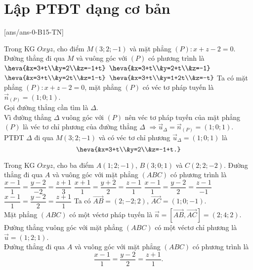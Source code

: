 \section{Lập PTĐT dạng cơ bản}
\TN
{}[ans/ans-0-B15-TN]
\setcounter{ex}{9}
\begin{ex}%
	Trong KG $Oxyz$, cho điểm $M(3;2 ;-1)$ và mặt phẳng $(P)\colon x+z-2=0$. Đường thẳng đi qua $M$ và vuông góc với $(P)$ có phương trình là
	\choice
	{\True $\heva{&x=3+t\\&y=2\\&z=-1+t}$}
	{$\heva{&x=3+t\\&y=2+t\\&z=-1}$}
	{$\heva{&x=3+t\\&y=2t\\&z=1-t}$}
	{$\heva{&x=3+t\\&y=1+2t\\&z=-t}$}
	\loigiai
	{
	Ta có mặt phẳng $(P)\colon x+z-2=0$, mặt phẳng $(P)$ có véc tơ pháp tuyến là $\overrightarrow{n}_{(P)}=(1;0;1)$.\\
		Gọi đường thẳng cần tìm là $\Delta$.\\
		Vì đường thẳng $\Delta$ vuông góc với $(P)$ nên véc tơ pháp tuyến của mặt phẳng $(P)$ là véc tơ chỉ phương của đường thẳng $\Delta$ $\Rightarrow \overrightarrow{u}_{\Delta}=\overrightarrow{n}_{(P)}=(1;0;1)$.\\
		PTĐT $\Delta$ đi qua $M(3;2;-1)$ và có véc tơ chỉ phương $\overrightarrow{u}_{\Delta}=(1;0;1)$ là
		\[\heva{&x=3+t\\&y=2\\&z=-1+t.}\]
	}
\end{ex}
\begin{ex}%
	Trong KG $Oxyz$, cho ba điểm $A(1;2;-1)$, $B(3;0;1)$ và $C(2;2;-2)$. Đường thẳng đi qua $A$ và vuông góc với mặt phẳng $(ABC)$ có phương trình là
	\choice
	{$\dfrac{x-1}{1}=\dfrac{y-2}{-2}=\dfrac{z+1}{3}$}
	{$\dfrac{x+1}{1}=\dfrac{y+2}{2}=\dfrac{z-1}{1}$}
	{$\dfrac{x-1}{1}=\dfrac{y-2}{2}=\dfrac{z-1}{-1}$}
	{\True $\dfrac{x-1}{1}=\dfrac{y-2}{2}=\dfrac{z+1}{1}$}
	\loigiai
	{Ta có $\overrightarrow{AB}=(2;-2;2)$, $\overrightarrow{AC}=(1;0;-1)$.\\
		Mặt phẳng $(ABC)$ có một véctơ pháp tuyến là $\vec{n}=\left[\overrightarrow{AB},\overrightarrow{AC}\right]=(2;4;2)$.\\
		Đường thẳng vuông góc với mặt phẳng $(ABC)$ có một véctơ chỉ phương là $\vec{u}=(1;2;1)$.\\
		Đường thẳng đi qua $A$ và vuông góc với mặt phẳng $(ABC)$ có phương trình là
		\[\dfrac{x-1}{1}=\dfrac{y-2}{2}=\dfrac{z+1}{1}.\]
	}
\end{ex}
